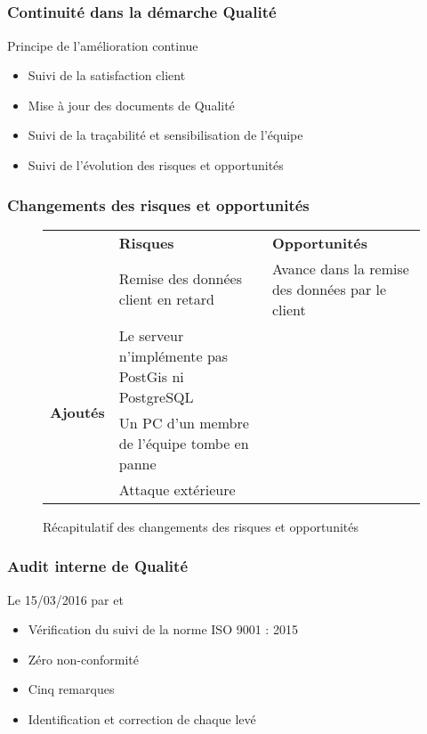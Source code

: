 
\speaker{\Pierre}

\subsection{} %


\begin{frame}
\frametitle{Continuité dans la démarche Qualité}
\begin{block}{Principe de l'amélioration continue}
\begin{itemize}
\item Suivi de la satisfaction client
\item Mise à jour des documents de Qualité
\item Suivi de la traçabilité et sensibilisation de l'équipe
\item Suivi de l'évolution des risques et opportunités
\end{itemize}
\end{block}
\end{frame}




\begin{frame}
\frametitle{Changements des risques et opportunités}
\begin{figure}
\begin{longtable}{|p{1.8cm}||p{3.5cm}|p{3.5cm}|}
\hline
 & \textbf{Risques} & \textbf{Opportunités} \\\hhline{|=||=|=|}
\multirow{3}{*}{\textbf{Supprimés}} & \small Remise des données client en retard & \small Avance dans la remise des données par le client \\\hline

\multirow{3}{*}{\textbf{Ajoutés}} & \small Le serveur n’implémente pas PostGis ni PostgreSQL & \\ \cline{2-2}
 & \small Un PC d’un membre de l’équipe tombe en panne & \\\cline{2-2}
 &  \small Attaque extérieure & \\\hline


\end{longtable}
\caption{Récapitulatif des changements des risques et opportunités}
\end{figure}
\end{frame}



\begin{frame}
\frametitle{Audit interne de Qualité}
\begin{block}{Le 15/03/2016 par \nomApprobateur{} et \nomTuteurQualite{}}
\begin{itemize}
\item Vérification du suivi de la norme ISO 9001 : 2015
\item Zéro non-conformité
\item Cinq remarques
\item Identification et correction de chaque \FT{} levé
\end{itemize}
\end{block}
\end{frame}





